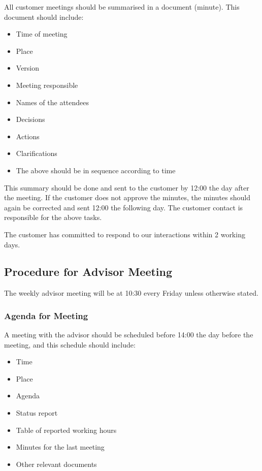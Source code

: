 All customer meetings should be summarised in a document (minute). This document should include:
\begin{itemize}
	\item Time of meeting
	\item Place
	\item Version
	\item Meeting responsible
	\item Names of the attendees
	\item Decisions
	\item Actions
	\item Clarifications
	\item The above should be in sequence according to time
\end{itemize}

This summary should be done and sent to the customer by 12:00 the day after the meeting. If the customer does not approve the minutes, the minutes should again be corrected and sent 12:00 the following day. The customer contact is responsible for the above tasks.

The customer has committed to respond to our interactions within 2 working days.

\subsection{Procedure for Advisor Meeting}
The weekly advisor meeting will be at 10:30 every Friday unless otherwise stated.

\subsubsection{Agenda for Meeting}
A meeting with the advisor should be scheduled before 14:00 the day before the meeting, and this schedule should include:
\begin{itemize}
	\item Time
	\item Place
	\item Agenda
	\item Status report
	\item Table of reported working hours
	\item Minutes for the last meeting
	\item Other relevant documents
\end{itemize}

